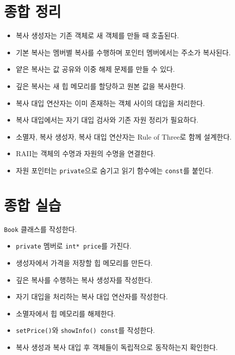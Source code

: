 \documentclass[11pt,a4paper]{article}
\begin{document}
\section{종합 정리}
\begin{importantbox}
\begin{itemize}[leftmargin=1.5em]
    \item 복사 생성자는 기존 객체로 새 객체를 만들 때 호출된다.
    \item 기본 복사는 멤버별 복사를 수행하며 포인터 멤버에서는 주소가 복사된다.
    \item 얕은 복사는 값 공유와 이중 해제 문제를 만들 수 있다.
    \item 깊은 복사는 새 힙 메모리를 할당하고 원본 값을 복사한다.
    \item 복사 대입 연산자는 이미 존재하는 객체 사이의 대입을 처리한다.
    \item 복사 대입에서는 자기 대입 검사와 기존 자원 정리가 필요하다.
    \item 소멸자, 복사 생성자, 복사 대입 연산자는 Rule of Three로 함께 설계한다.
    \item RAII는 객체의 수명과 자원의 수명을 연결한다.
    \item 자원 포인터는 \texttt{private}으로 숨기고 읽기 함수에는 \texttt{const}를 붙인다.
\end{itemize}
\end{importantbox}

\section{종합 실습}
\begin{practicebox}
\texttt{Book} 클래스를 작성한다.
\begin{itemize}[leftmargin=1.5em]
    \item \texttt{private} 멤버로 \texttt{int* price}를 가진다.
    \item 생성자에서 가격을 저장할 힙 메모리를 만든다.
    \item 깊은 복사를 수행하는 복사 생성자를 작성한다.
    \item 자기 대입을 처리하는 복사 대입 연산자를 작성한다.
    \item 소멸자에서 힙 메모리를 해제한다.
    \item \texttt{setPrice()}와 \texttt{showInfo() const}를 작성한다.
    \item 복사 생성과 복사 대입 후 객체들이 독립적으로 동작하는지 확인한다.
\end{itemize}
\end{practicebox}
\end{document}
